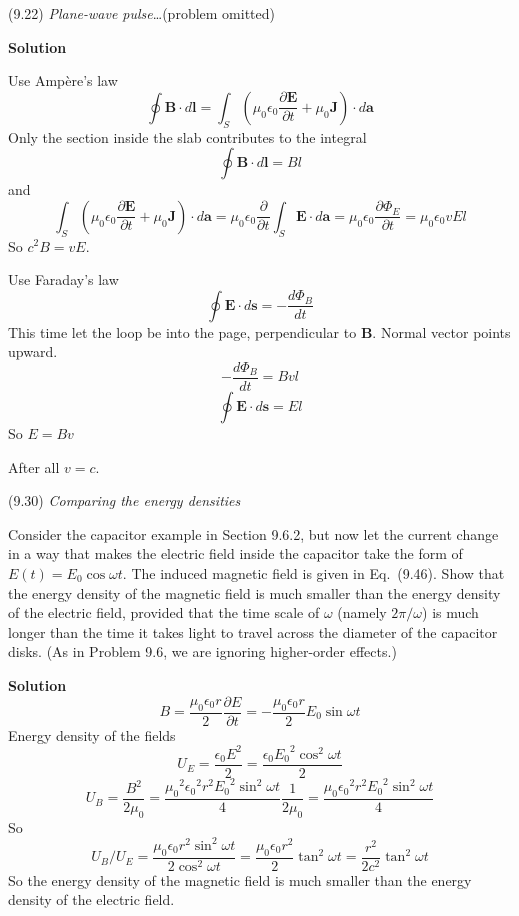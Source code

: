 \documentclass{article}
\begin{document}
\begin{homeworkProblem}
	(9.22) \textit{Plane-wave pulse}\ldots (problem omitted)

	\textbf{Solution}
	\begin{enumerate}[label = (\alph*)]
		\begin{item}
			Use Amp\`{e}re's law
			\[
				\oint\mathbf{B}\cdot d\mathbf{l}=\int_S\left(\mu_0\epsilon_0\frac{\partial\mathbf{E}}{\partial t}+\mu_0\mathbf{J}\right)\cdot d\mathbf{a}
			\]
			Only the section inside the slab contributes to the integral
			\[
				\oint\mathbf{B}\cdot d\mathbf{l}=Bl
			\]
			and
			\[
				\int_S\left(\mu_0\epsilon_0\frac{\partial\mathbf{E}}{\partial t}+\mu_0\mathbf{J}\right)\cdot d\mathbf{a}=\mu_0\epsilon_0\frac{\partial}{\partial t}\int_S\mathbf{E}\cdot d\mathbf{a}=\mu_0\epsilon_0\frac{\partial\Phi_E}{\partial t}=\mu_0\epsilon_0 vEl
			\]
			So $c^2B=vE$.
		\end{item}
		\begin{item}
			Use Faraday's law
			\[
				\oint\mathbf{E}\cdot d\mathbf{s}=-\frac{d\Phi_B}{dt}
			\]
			This time let the loop be into the page, perpendicular to $\mathbf{B}$. Normal vector points upward.
			\[
				-\frac{d\Phi_B}{dt}=Bvl
			\]
			\[
				\oint\mathbf{E}\cdot d\mathbf{s}=El
			\]
			So $E=Bv$
		\end{item}
	\end{enumerate}
	After all $v=c$.
\end{homeworkProblem}


\begin{homeworkProblem}
	(9.30) \textit{Comparing the energy densities}

	Consider the capacitor example in Section 9.6.2, but now let the current change in a way that makes the electric field inside the capacitor take the form of $E(t)=E_0\cos\omega t$. The induced magnetic field is given in Eq.~(9.46). Show that the energy density of the magnetic field is much smaller than the energy density of the electric field, provided that the time scale of $\omega$ (namely $2\pi/\omega$) is much longer than the time it takes light to travel across the diameter of the capacitor disks. (As in Problem 9.6, we are ignoring higher-order effects.)

	\textbf{Solution}
	\[
		B=\frac{\mu_0\epsilon_0r}{2}\frac{\partial E}{\partial t}=-\frac{\mu_0\epsilon_0r}{2}E_0\sin\omega t
	\]
	Energy density of the fields
	\[
		U_E=\frac{\epsilon_0E^2}{2}=\frac{\epsilon_0{E_0}^2\cos^2\omega t}{2}
	\]
	\[
		U_B=\frac{B^2}{2\mu_0}=\frac{{\mu_0}^2{\epsilon_0}^2r^2{E_0}^2\sin^2\omega t}{4}\frac{1}{2\mu_0}=\frac{\mu_0{\epsilon_0}^2r^2{E_0}^2\sin^2\omega t}{4}
	\]
	So
	\[
		U_B/U_E=\frac{\mu_0\epsilon_0r^2\sin^2\omega t}{2\cos^2\omega t}=\frac{\mu_0\epsilon_0r^2}{2}\tan^2\omega t=\frac{r^2}{2c^2}\tan^2\omega t
	\]
	So the energy density of the magnetic field is much smaller than the energy density of the electric field.
\end{homeworkProblem}
\end{document}
